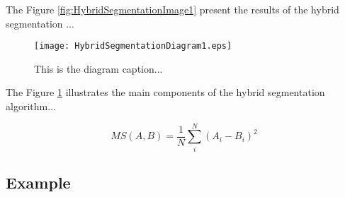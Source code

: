 The Figure \ref{fig:HybridSegmentationImage1} present the results
of the hybrid segmentation ...




%
%
%

\begin{figure}
\center
\texttt{[image: HybridSegmentationDiagram1.eps]}
\caption{This is the diagram caption...}
\label{fig:HybridSegmentationDiagram1}
\end{figure}

The Figure \ref{fig:HybridSegmentationDiagram1} illustrates the main
components of the hybrid segmentation algorithm...




%
%


\begin{equation}
MS(A,B) = \frac{1}{N} \sum_i^N \left( A_i - B_i \right)^2
\end{equation}





\subsection{Example}
\label{sec:HybridSegmentationExample1}




